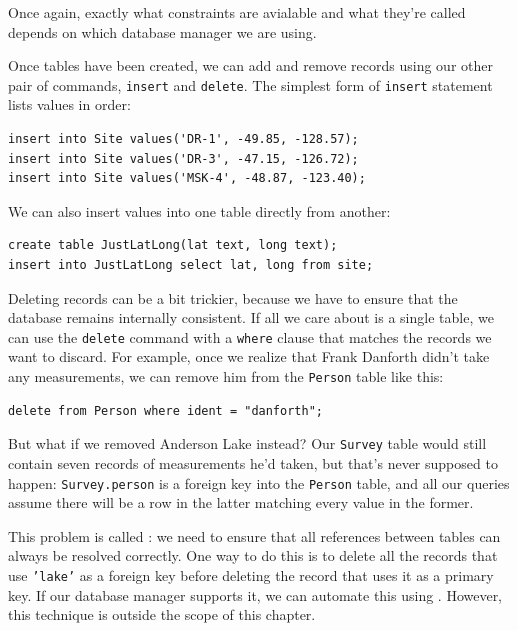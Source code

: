 \documentclass{book}
\begin{document}
Once again, exactly what constraints are avialable and what they're
called depends on which database manager we are using.

Once tables have been created, we can add and remove records using our
other pair of commands, \texttt{insert} and \texttt{delete}. The
simplest form of \texttt{insert} statement lists values in order:

\begin{verbatim}
insert into Site values('DR-1', -49.85, -128.57);
insert into Site values('DR-3', -47.15, -126.72);
insert into Site values('MSK-4', -48.87, -123.40);
\end{verbatim}

We can also insert values into one table directly from another:

\begin{verbatim}
create table JustLatLong(lat text, long text);
insert into JustLatLong select lat, long from site;
\end{verbatim}

Deleting records can be a bit trickier, because we have to ensure that
the database remains internally consistent. If all we care about is a
single table, we can use the \texttt{delete} command with a
\texttt{where} clause that matches the records we want to discard. For
example, once we realize that Frank Danforth didn't take any
measurements, we can remove him from the \texttt{Person} table like
this:

\begin{verbatim}
delete from Person where ident = "danforth";
\end{verbatim}

But what if we removed Anderson Lake instead? Our \texttt{Survey} table
would still contain seven records of measurements he'd taken, but that's
never supposed to happen: \texttt{Survey.person} is a foreign key into
the \texttt{Person} table, and all our queries assume there will be a
row in the latter matching every value in the former.

This problem is called : we need to ensure that all references between tables can
always be resolved correctly. One way to do this is to delete all the
records that use \texttt{'lake'} as a foreign key before deleting the
record that uses it as a primary key. If our database manager supports
it, we can automate this using . However, this technique is outside the scope of this chapter.
\end{document}
